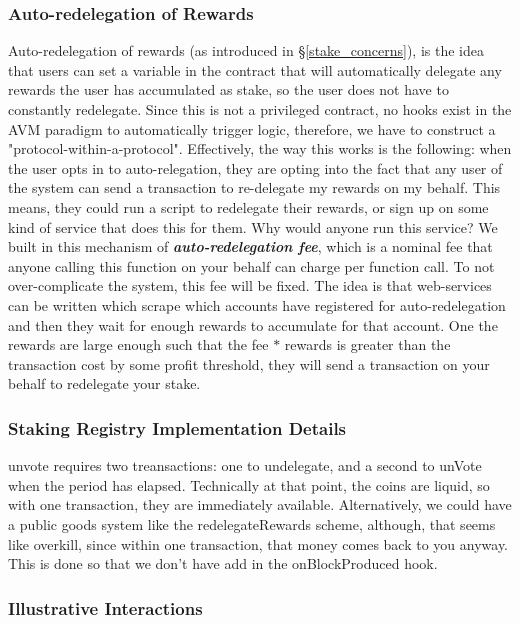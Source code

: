 \subsubsection{Auto-redelegation of Rewards}
Auto-redelegation of rewards (as introduced in \S\ref{stake_concerns}), is the idea that users can set a variable in the contract that will automatically delegate any rewards the user has accumulated as stake, so the user does not have to constantly redelegate. Since this is not a privileged contract, no hooks exist in the AVM paradigm to automatically trigger logic, therefore, we have to construct a "protocol-within-a-protocol". Effectively, the way this works is the following: when the user opts in to auto-relegation, they are opting into the fact that any user of the system can send a transaction to re-delegate my rewards on my behalf. This means, they could run a script to redelegate their rewards, or sign up on some kind of service that does this for them. Why would anyone run this service? We built in this mechanism of \textbf{\textit{auto-redelegation fee}}, which is a nominal fee that anyone calling this function on your behalf can charge per function call. To not over-complicate the system, this fee will be fixed. The idea is that web-services can be written which scrape which accounts have registered for auto-redelegation and then they wait for enough rewards to accumulate for that account. One the rewards are large enough such that the fee $*$ rewards is greater than the transaction cost by some profit threshold, they will send a transaction on your behalf to redelegate your stake.  

\subsubsection{Staking Registry Implementation Details}
unvote requires two treansactions: one to undelegate, and a second to unVote when the period has elapsed. Technically at that point, the coins are liquid, so with one transaction, they are immediately available. Alternatively, we could have a public goods system like the redelegateRewards scheme, although, that seems like overkill, since within one transaction, that money comes back to you anyway. This is done so that we don't have add in the onBlockProduced hook. 

\subsubsection{Illustrative Interactions}

